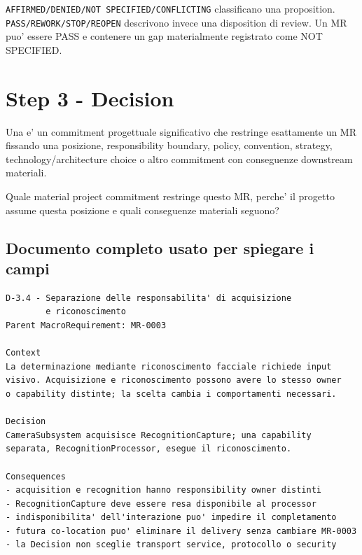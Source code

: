 \documentclass[11pt,a4paper]{article}
\begin{document}
\begin{ddtaanti}[title={Evidence classification != gate result}]
\texttt{AFFIRMED/DENIED/NOT SPECIFIED/CONFLICTING} classificano una proposition. \texttt{PASS/REWORK/STOP/REOPEN} descrivono invece una disposition di review. Un MR puo' essere PASS e contenere un gap materialmente registrato come NOT SPECIFIED.
\end{ddtaanti}

\section{Step 3 - Decision}
\closedtag

Una \DEC{} e' un commitment progettuale significativo che restringe esattamente un MR fissando una posizione, responsibility boundary, policy, convention, strategy, technology/architecture choice o altro commitment con conseguenze downstream materiali.

\begin{ddtacheck}[title={Domanda fondamentale}]
Quale material project commitment restringe questo MR, perche' il progetto assume questa posizione e quali conseguenze materiali seguono?
\end{ddtacheck}

\subsection{Documento completo usato per spiegare i campi}

\begin{ddtaexample}[title={Facial Access - D-3.4 separazione acquisizione/riconoscimento}]
\begin{lstlisting}
D-3.4 - Separazione delle responsabilita' di acquisizione
        e riconoscimento
Parent MacroRequirement: MR-0003

Context
La determinazione mediante riconoscimento facciale richiede input
visivo. Acquisizione e riconoscimento possono avere lo stesso owner
o capability distinte; la scelta cambia i comportamenti necessari.

Decision
CameraSubsystem acquisisce RecognitionCapture; una capability
separata, RecognitionProcessor, esegue il riconoscimento.

Consequences
- acquisition e recognition hanno responsibility owner distinti
- RecognitionCapture deve essere resa disponibile al processor
- indisponibilita' dell'interazione puo' impedire il completamento
- futura co-location puo' eliminare il delivery senza cambiare MR-0003
- la Decision non sceglie transport service, protocollo o security
\end{lstlisting}
\end{ddtaexample}
\end{document}
